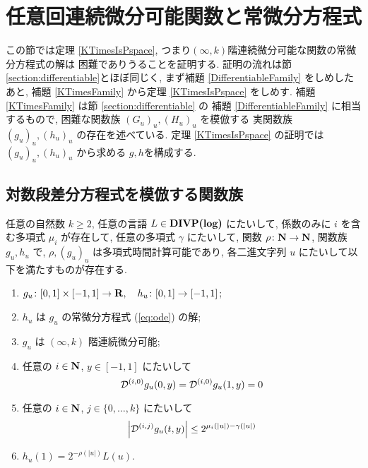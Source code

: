 \section{任意回連続微分可能関数と常微分方程式}

この節では定理 \ref{KTimesIsPspace}, 
つまり$(\infty, k)$階連続微分可能な関数の常微分方程式の解は
\DIVPlog 困難でありうることを証明する.
証明の流れは節 \ref{section:differentiable}とほぼ同じく, 
まず補題 \ref{DifferentiableFamily} をしめしたあと,
補題 \ref{KTimesFamily} から定理 \ref{KTimesIsPspace} をしめす.
補題 \ref{KTimesFamily} は節 \ref{section:differentiable} の
補題 \ref{DifferentiableFamily} に相当するもので,
\DIVPlog 困難な関数族 $(G_u)_u, (H_u)_u$ を模倣する
実関数族 $(g_u)_u, (h_u)_u$ の存在を述べている.
定理 \ref{KTimesIsPspace} の証明では
$(g_u)_u, (h_u)_u$ から求める $g, h$を構成する.



\subsection{対数段差分方程式を模倣する関数族}

 \begin{lemma}
  \label{KTimesFamily}
  任意の自然数 $k \ge 2$,
  任意の言語 $L \in \text{\bf DIVP(log)}$ にたいして,
  係数のみに $i$ を含む多項式 $\mu_i$ が存在して,
  任意の多項式 $\gamma$ にたいして,
  関数 $\rho \colon \mathbf N \to \mathbf N$, 関数族 $g_u, h_u$ で,
  $\rho, (g_u)_u$ は多項式時間計算可能であり,
  各二進文字列 $u$ にたいして以下を満たすものが存在する.
  \begin{enumerate}
   \item $g_u\colon [0,1] \times [-1,1]\to \mathbf R, \quad h_u\colon [0,1] \to [-1,1]$;
   \item $h_u$ は $g_u$ の常微分方程式 (\ref{eq:ode}) の解;
   \item $g_u$ は $(\infty, k)$ 階連続微分可能;
   \item 任意の $i \in \mathbf N$, $y \in [-1,1]$ にたいして
	 \begin{equation*}
	  \mathcal D^{(i, 0)} g_u(0,y) = \mathcal D^{(i, 0)} g_u(1,y) = 0 
	 \end{equation*}
   \item 任意の $i \in \mathbf N$, $j \in \{0, \dots, k\}$ にたいして
	 \begin{equation*}
	  \left|\mathcal D^{(i,j)} g_u(t,y)\right| \le 2^{\mu_i(|u|) - \gamma(|u|)}
	 \end{equation*}
	 \label{enum:inftyk}
   \item $h_u(1) = 2^{-\rho(|u|)}L(u)$.
  \end{enumerate}
 \end{lemma}


